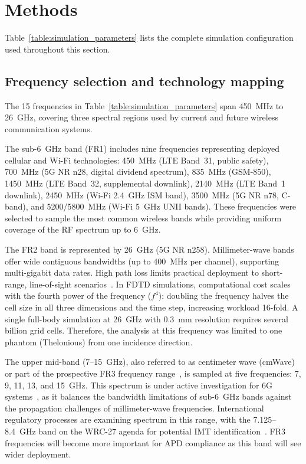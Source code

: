 \documentclass{iopjournal}
\begin{document}
\section{Methods}
\label{sec:methods}

Table~\ref{table:simulation_parameters} lists the complete simulation configuration used throughout this section.

\subsection{Frequency selection and technology mapping}
The 15 frequencies in Table~\ref{table:simulation_parameters} span 450~MHz to 26~GHz, covering three spectral regions used by current and future wireless communication systems.

The sub-6~GHz band (FR1) includes nine frequencies representing deployed cellular and Wi-Fi technologies: 450~MHz (LTE Band~31, public safety), 700~MHz (5G NR n28, digital dividend spectrum), 835~MHz (GSM-850), 1450~MHz (LTE Band~32, supplemental downlink), 2140~MHz (LTE Band~1 downlink), 2450~MHz (Wi-Fi 2.4~GHz ISM band), 3500~MHz (5G NR n78, C-band), and 5200/5800~MHz (Wi-Fi 5~GHz UNII bands).
These frequencies were selected to sample the most common wireless bands while providing uniform coverage of the \gls{RF} spectrum up to 6~GHz.

The FR2 band is represented by 26~GHz (5G NR n258).
Millimeter-wave bands offer wide contiguous bandwidths (up to 400~MHz per channel), supporting multi-gigabit data rates.
High path loss limits practical deployment to short-range, line-of-sight scenarios~\citep{rappaport2019wireless}.
In \gls{FDTD} simulations, computational cost scales with the fourth power of the frequency ($f^4$): doubling the frequency halves the cell size in all three dimensions and the time step, increasing workload 16-fold.
A single full-body simulation at 26~GHz with 0.3~mm resolution requires several billion grid cells.
Therefore, the analysis at this frequency was limited to one phantom (Thelonious) from one incidence direction.

The upper mid-band (7--15~GHz), also referred to as centimeter wave (cmWave) or part of the prospective FR3 frequency range~\citep{nextg2023terminology}, is sampled at five frequencies: 7, 9, 11, 13, and 15~GHz.
This spectrum is under active investigation for 6G systems~\citep{tataria2024cmwave}, as it balances the bandwidth limitations of sub-6~GHz bands against the propagation challenges of millimeter-wave frequencies.
International regulatory processes are examining spectrum in this range, with the 7.125--8.4~GHz band on the WRC-27 agenda for potential IMT identification~\citep{gsma2024wrc}.
FR3 frequencies will become more important for \gls{APD} compliance as this band will see wider deployment.
\end{document}

